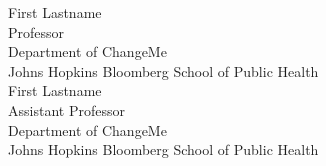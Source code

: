 \begin{singlespace}


\indent First Lastname  \\
\indent \indent Professor\\
\indent \indent Department of ChangeMe\\
\indent \indent  Johns Hopkins Bloomberg School of Public Health \\

\noindent First Lastname  \\
\indent \indent Assistant Professor\\
\indent \indent Department of ChangeMe\\
\indent \indent  Johns Hopkins Bloomberg School of Public Health \\




\end{singlespace}















